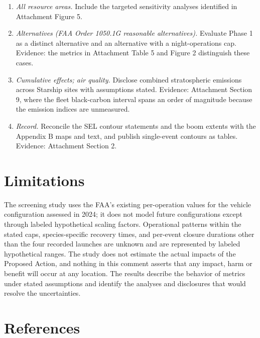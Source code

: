 \documentclass[11pt]{article}
\begin{document}
\begin{enumerate}[leftmargin=*, itemsep=2pt]
\item \textit{All resource areas.} Include the targeted sensitivity analyses identified in Attachment Figure 5.
\item \textit{Alternatives (FAA Order 1050.1G reasonable alternatives).} Evaluate Phase 1 as a distinct alternative and an alternative with a night-operations cap. Evidence: the metrics in Attachment Table 5 and Figure 2 distinguish these cases.
\item \textit{Cumulative effects; air quality.} Disclose combined stratospheric emissions across Starship sites with assumptions stated. Evidence: Attachment Section 9, where the fleet black-carbon interval spans an order of magnitude because the emission indices are unmeasured.
\item \textit{Record.} Reconcile the SEL contour statements and the boom extents with the Appendix B maps and text, and publish single-event contours as tables. Evidence: Attachment Section 2.
\end{enumerate}

\section{Limitations}

The screening study uses the FAA's existing per-operation values for the vehicle configuration assessed in 2024; it does not model future configurations except through labeled hypothetical scaling factors. Operational patterns within the stated caps, species-specific recovery times, and per-event closure durations other than the four recorded launches are unknown and are represented by labeled hypothetical ranges. The study does not estimate the actual impacts of the Proposed Action, and nothing in this comment asserts that any impact, harm or benefit will occur at any location. The results describe the behavior of metrics under stated assumptions and identify the analyses and disclosures that would resolve the uncertainties.

\section{References}
\end{document}
